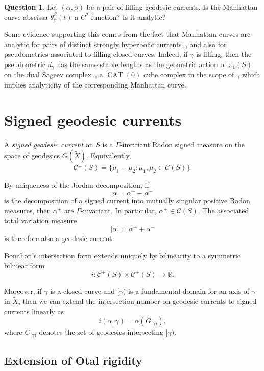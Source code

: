 \documentclass[12pt]{amsart}
\numberwithin{equation}{section}
\numberwithin{figure}{section}
\theoremstyle{definition}
\newtheorem{question}[equation]{Question}
\theoremstyle{plain}
\DeclareMathOperator{\CAT}{CAT}
\begin{document}
\begin{question}
Let $(\alpha,\beta)$ be a pair of filling geodesic currents. Is the Manhattan curve abscissa $\theta_\alpha^\beta(t)$ a $C^2$ function? Is it analytic?
\end{question}

Some evidence supporting this comes from the fact that Manhattan curves are analytic for pairs of distinct strongly hyperbolic currents~\cite[Proposition~2.12]{CT25:Manhattan}, and also for pseudometrics associated to filling closed curves. Indeed, if $\gamma$ is filling, then the pseudometric $d_\gamma$ has the same stable lengths as the geometric action of $\pi_1(S)$ on the dual Sageev complex~\cite{S02:Cube2}, a $\CAT(0)$ cube complex in the scope of~\cite[Theorem~6.1]{CT25:Cubulations}, which implies analyticity of the corresponding Manhattan curve.
\appendix 
\appendix

\section{Signed geodesic currents}
\label{sec:signed}

A \emph{signed geodesic current} on $S$ is a $\Gamma$-invariant Radon signed measure on the space of geodesics $G(\widetilde X)$.
Equivalently,
\[
\mathcal C^{\pm}(S)
=
\{
\mu_1-\mu_2 :
\mu_1,\mu_2\in \mathcal C(S)
\}.
\]

By uniqueness of the Jordan decomposition, if
\[
\alpha=\alpha^+-\alpha^-
\]
is the decomposition of a signed current into mutually singular positive Radon measures, then $\alpha^\pm$ are $\Gamma$-invariant. In particular, $\alpha^\pm \in \mathcal C(S)$.
The associated total variation measure
\[
|\alpha|=\alpha^++\alpha^-
\]
is therefore also a geodesic current.

Bonahon's intersection form extends uniquely by bilinearity to a symmetric bilinear form
\[
i:\mathcal C^\pm(S)\times \mathcal C^\pm(S)\to \mathbb R.
\]

Moreover, if $\gamma$ is a closed curve and $[\gamma)$ is a fundamental domain for an axis of $\gamma$ in $\widetilde X$, then we can extend the intersection number on geodesic currents to signed currents linearly as
\[
i(\alpha,\gamma)=\alpha(G_{[\gamma)}),
\]
where $G_{[\gamma)}$ denotes the set of geodesics intersecting $[\gamma)$.

\subsection{Extension of Otal rigidity}
\end{document}
